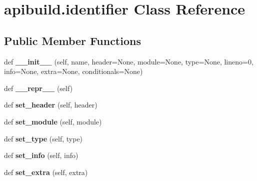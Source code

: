 \hypertarget{classapibuild_1_1identifier}{}\section{apibuild.\+identifier Class Reference}
\label{classapibuild_1_1identifier}
\subsection*{Public Member Functions}
\begin{DoxyCompactItemize}
\item 
\mbox{\label{classapibuild_1_1identifier_adf164ae47c4aeaddeab00803704256d1}} 
def {\bfseries \+\_\+\+\_\+init\+\_\+\+\_\+} (self, name, header=None, module=None, type=None, lineno=0, info=None, extra=None, conditionals=None)
\item 
\mbox{\label{classapibuild_1_1identifier_a7b904b6eb1dcaaa2322b18bebedaa439}} 
def {\bfseries \+\_\+\+\_\+repr\+\_\+\+\_\+} (self)
\item 
\mbox{\label{classapibuild_1_1identifier_acb1d22a38f8a8fe8bb9e234e546f2a9c}} 
def {\bfseries set\+\_\+header} (self, header)
\item 
\mbox{\label{classapibuild_1_1identifier_a72be6c8cf7ec036b2c5c53ae6cff3a6a}} 
def {\bfseries set\+\_\+module} (self, module)
\item 
\mbox{\label{classapibuild_1_1identifier_acea93f54c880a01e3522c5dd3c57f590}} 
def {\bfseries set\+\_\+type} (self, type)
\item 
\mbox{\label{classapibuild_1_1identifier_aaa6d0d3111ed4729ea4ae06f7cf77bab}} 
def {\bfseries set\+\_\+info} (self, info)
\item 
\mbox{\label{classapibuild_1_1identifier_af3a38468ad728cc4e2751184b64c3431}} 
def {\bfseries set\+\_\+extra} (self, extra)
\item 
\mbox{\label{classapibuild_1_1identifier_a1170f45c3e06ce6581936ab22ec18a95}} 

\end{DoxyCompactItemize}
